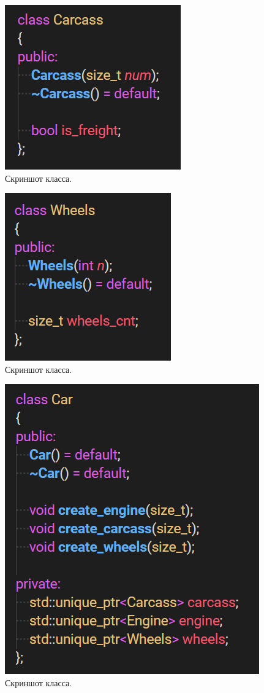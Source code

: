 \documentclass[12pt]{report}
\begin{document}
\begin{figure}
	\centering
	\includegraphics{Carcass.PNG}
	\caption{Скриншот класса.}
	\label{fig:mpr}
\end{figure}

\begin{figure}
	\centering
	\includegraphics{Wheels.PNG}
	\caption{Скриншот класса.}
	\label{fig:mpr}
\end{figure}

\begin{figure}
	\centering
	\includegraphics{Car.PNG}
	\caption{Скриншот класса.}
	\label{fig:mpr}
\end{figure}
\end{document}
